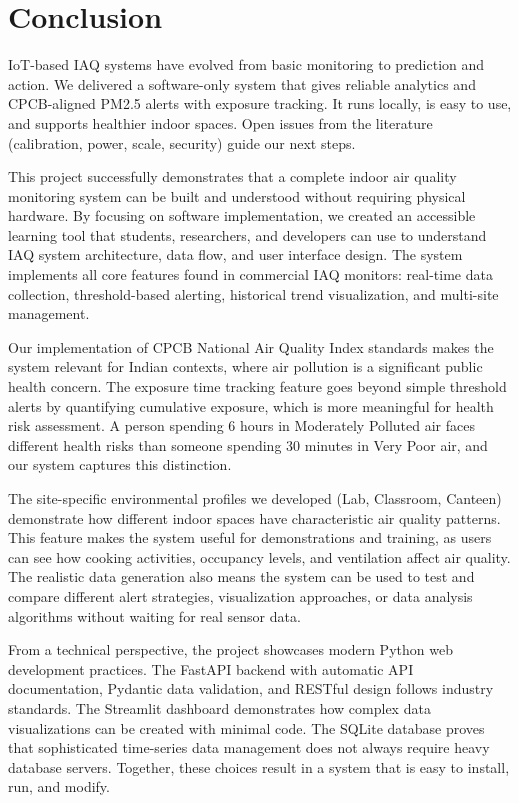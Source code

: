 \documentclass[12pt]{report}
\begin{document}
\section{Conclusion}
IoT-based IAQ systems have evolved from basic monitoring to prediction and action. We delivered a software-only system that gives reliable analytics and CPCB-aligned PM2.5 alerts with exposure tracking. It runs locally, is easy to use, and supports healthier indoor spaces. Open issues from the literature (calibration, power, scale, security) guide our next steps.

This project successfully demonstrates that a complete indoor air quality monitoring system can be built and understood without requiring physical hardware. By focusing on software implementation, we created an accessible learning tool that students, researchers, and developers can use to understand IAQ system architecture, data flow, and user interface design. The system implements all core features found in commercial IAQ monitors: real-time data collection, threshold-based alerting, historical trend visualization, and multi-site management.

Our implementation of CPCB National Air Quality Index standards makes the system relevant for Indian contexts, where air pollution is a significant public health concern. The exposure time tracking feature goes beyond simple threshold alerts by quantifying cumulative exposure, which is more meaningful for health risk assessment. A person spending 6 hours in Moderately Polluted air faces different health risks than someone spending 30 minutes in Very Poor air, and our system captures this distinction.

The site-specific environmental profiles we developed (Lab, Classroom, Canteen) demonstrate how different indoor spaces have characteristic air quality patterns. This feature makes the system useful for demonstrations and training, as users can see how cooking activities, occupancy levels, and ventilation affect air quality. The realistic data generation also means the system can be used to test and compare different alert strategies, visualization approaches, or data analysis algorithms without waiting for real sensor data.

From a technical perspective, the project showcases modern Python web development practices. The FastAPI backend with automatic API documentation, Pydantic data validation, and RESTful design follows industry standards. The Streamlit dashboard demonstrates how complex data visualizations can be created with minimal code. The SQLite database proves that sophisticated time-series data management does not always require heavy database servers. Together, these choices result in a system that is easy to install, run, and modify.
\end{document}
